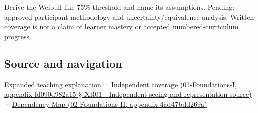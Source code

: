 Derive the Weibull-like 75\% threshold and name its assumptions. Pending: approved participant methodology and uncertainty/equivalence analysis. Written coverage is not a claim of learner mastery or accepted numbered-curriculum progress.

\subsection{Source and navigation}\label{source-and-navigation}

\href{Continuous\%20Notes/University\%20-\%20Worlds,\%20Images\%20and\%20Inference\%20-\%20Graphics,\%20Vision\%20and\%20Photography\#A\%20threshold\%20is\%20evidence\%20from\%20a\%20procedure,\%20not\%20a\%20universal\%20border}{Expanded teaching explanation} · \href{}{Independent coverage (01-Foundations-I, appendix-fd090d982a15 § XR01 - Independent seeing and representation source)} · \href{}{Dependency Map (02-Foundations-II, appendix-4ad47bdd269a)}
